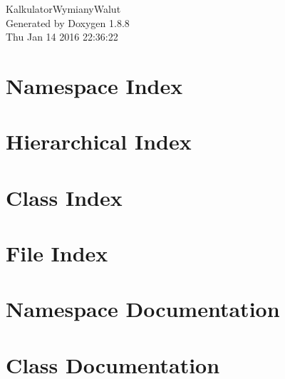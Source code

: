 \documentclass[twoside]{book}
\newcommand{\+}{\discretionary{\mbox{\scriptsize$\hookleftarrow$}}{}{}}
\newcommand{\clearemptydoublepage}{%
  \newpage{\pagestyle{empty}\cleardoublepage}%
}
\begin{document}
\hypersetup{pageanchor=false,
             bookmarks=true,
             bookmarksnumbered=true,
             pdfencoding=unicode
            }
\begin{titlepage}
\vspace*{7cm}
\begin{center}%
{\Large Kalkulator\+Wymiany\+Walut }\\
\vspace*{1cm}
{\large Generated by Doxygen 1.8.8}\\
\vspace*{0.5cm}
{\small Thu Jan 14 2016 22:36:22}\\
\end{center}
\end{titlepage}
\clearemptydoublepage
\tableofcontents
\clearemptydoublepage
{}
\hypersetup{pageanchor=true}

\chapter{Namespace Index}

\chapter{Hierarchical Index}

\chapter{Class Index}

\chapter{File Index}

\chapter{Namespace Documentation}




\chapter{Class Documentation}











\end{document}
